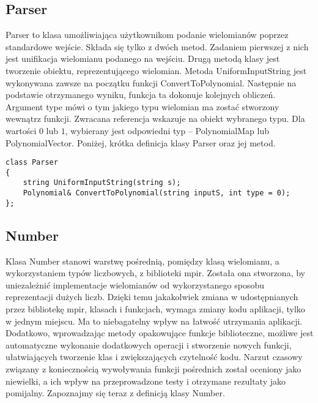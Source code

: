 \documentclass[twoside,a4paper]{book}
\begin{document}
\subsection{Parser}
Parser to klasa umożliwiająca użytkownikom podanie wielomianów poprzez standardowe wejście. Składa się tylko z dwóch metod. Zadaniem pierwszej z nich jest unifikacja wielomianu podanego na wejściu. Drugą metodą klasy jest tworzenie obiektu, reprezentującego wielomian. Metoda UniformInputString jest wykonywana zawsze na początku funkcji ConvertToPolynomial. Następnie na podstawie otrzymanego wyniku, funkcja ta dokonuje kolejnych obliczeń. Argument type mówi o tym jakiego typu wielomian ma zostać stworzony wewnątrz funkcji. Zwracana referencja wskazuje na obiekt wybranego typu. Dla wartości $0$ lub $1$, wybierany jest odpowiedni typ -- PolynomialMap lub PolynomialVector. Poniżej, krótka definicja klasy Parser oraz jej metod.

\begin{lstlisting}
class Parser
{
	string UniformInputString(string s);
	Polynomial& ConvertToPolynomial(string inputS, int type = 0);
};
\end{lstlisting}


\subsection{Number}
Klasa Number stanowi warstwę pośrednią, pomiędzy klasą wielomianu, a wykorzystaniem typów liczbowych, z biblioteki mpir. Została ona stworzona, by uniezależnić implementacje wielomianów od wykorzystanego sposobu reprezentacji dużych liczb. Dzięki temu jakakolwiek zmiana w udostępnianych przez bibliotekę mpir, klasach i funkcjach, wymaga zmiany kodu aplikacji, tylko w jednym miejscu. Ma to niebagatelny wpływ na łatwość utrzymania aplikacji. Dodatkowo, wprowadzając metody opakowujące funkcje biblioteczne, możliwe jest automatyczne wykonanie dodatkowych operacji i stworzenie nowych funkcji, ułatwiających tworzenie klas i zwiększających czytelność kodu. Narzut czasowy związany z koniecznością wywoływania funkcji pośrednich został oceniony jako niewielki, a ich wpływ na przeprowadzone testy i otrzymane rezultaty jako pomijalny. Zapoznajmy się teraz z definicją klasy Number.
\end{document}
